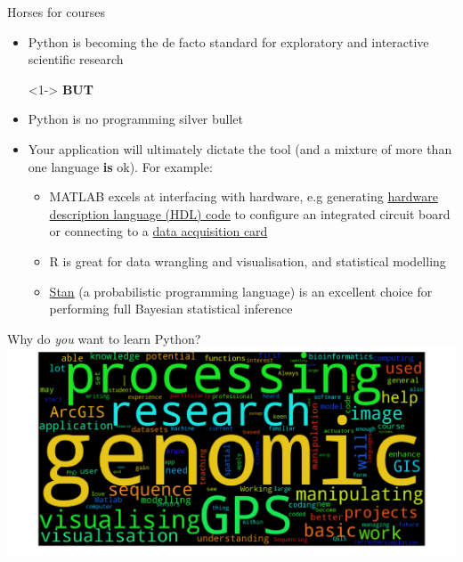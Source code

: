\documentclass[pdf]{beamer}
\begin{document}
\begin{frame}{Horses for courses}

\begin{itemize}\addtolength{\itemsep}{0.5\baselineskip}
	\item<1-> Python is becoming the de facto standard for exploratory and interactive scientific research\\
	\item[]<1-> \textbf{BUT}
	\item<2-> Python is no programming silver bullet
	\item<3-> Your application will ultimately dictate the tool (and a mixture of more than one language \textbf{is} ok). For example:\\
	\begin{itemize}\addtolength{\itemsep}{0.8\baselineskip}
		\item<4-> MATLAB excels at interfacing with hardware, e.g generating \href{https://uk.mathworks.com/products/hdl-coder.html}{hardware description language (HDL) code} to configure an integrated circuit board or connecting to a \href{https://uk.mathworks.com/products/daq.html}{data acquisition card}
		\item<5-> R is great for data wrangling and visualisation, and statistical modelling
		\item<6-> \href{http://mc-stan.org/}{Stan} (a probabilistic programming language) is an excellent choice for performing full Bayesian statistical inference
	\end{itemize}
\end{itemize}

\end{frame}

\begin{frame}{Why do \textit{you} want to learn Python?}
\centering
\includegraphics[width=\textwidth]{wordcloud.png}
\end{frame}
\end{document}
